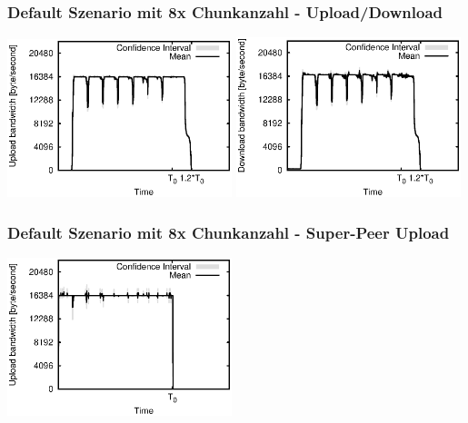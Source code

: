 \begin{frame}
  \frametitle{Default Szenario mit 8x Chunkanzahl - Upload/Download}
  \begin{center}
    \includegraphics[width=0.49\textwidth]{fig/plots/scenario_16_chunk_count_fac_8/plots/GeneratedMeanCurrentUploadBandwidth.csv.eps}
    \includegraphics[width=0.49\textwidth]{fig/plots/scenario_16_chunk_count_fac_8/plots/GeneratedMeanCurrentDownloadBandwidth.csv.eps}
  \end{center}
\end{frame}


\begin{frame}
  \frametitle{Default Szenario mit 8x Chunkanzahl - Super-Peer Upload}
  \begin{center}
    \includegraphics[width=0.49\textwidth]{fig/plots/scenario_16_chunk_count_fac_8/plots/GeneratedMeanCurrentSuperSeederUploadBandwidth.csv.eps}
  \end{center}
\end{frame}



